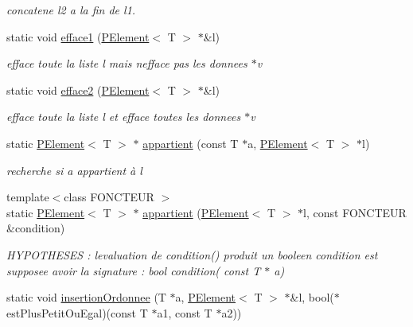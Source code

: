 \begin{DoxyCompactItemize}
\begin{DoxyCompactList}\small\item\em concatene l2 a la fin de l1. \end{DoxyCompactList}\item 
static void \mbox{\hyperlink{class_p_element_abd2e6b05692413616650fcd953317324}{efface1}} (\mbox{\hyperlink{class_p_element}{P\+Element}}$<$ T $>$ $\ast$\&l)
\begin{DoxyCompactList}\small\item\em efface toute la liste l mais n\textquotesingle{}efface pas les donnees $\ast$v \end{DoxyCompactList}\item 
static void \mbox{\hyperlink{class_p_element_a9e377727c7c78db9f49a7dde2ead74cd}{efface2}} (\mbox{\hyperlink{class_p_element}{P\+Element}}$<$ T $>$ $\ast$\&l)
\begin{DoxyCompactList}\small\item\em efface toute la liste l et efface toutes les donnees $\ast$v \end{DoxyCompactList}\item 
static \mbox{\hyperlink{class_p_element}{P\+Element}}$<$ T $>$ $\ast$ \mbox{\hyperlink{class_p_element_aee7ccc9dcc49558af92960dd60fafc9d}{appartient}} (const T $\ast$a, \mbox{\hyperlink{class_p_element}{P\+Element}}$<$ T $>$ $\ast$l)
\begin{DoxyCompactList}\small\item\em recherche si a appartient à l \end{DoxyCompactList}\item 
{\footnotesize template$<$class F\+O\+N\+C\+T\+E\+UR $>$ }\\static \mbox{\hyperlink{class_p_element}{P\+Element}}$<$ T $>$ $\ast$ \mbox{\hyperlink{class_p_element_ad1ad40db30605db39a57c08058cf444c}{appartient}} (\mbox{\hyperlink{class_p_element}{P\+Element}}$<$ T $>$ $\ast$l, const F\+O\+N\+C\+T\+E\+UR \&condition)
\begin{DoxyCompactList}\small\item\em H\+Y\+P\+O\+T\+H\+E\+S\+ES \+: l\textquotesingle{}evaluation de condition() produit un booleen condition est supposee avoir la signature \+: bool condition( const T $\ast$ a) \end{DoxyCompactList}\item 
static void \mbox{\hyperlink{class_p_element_a0e32256cbecaea72487f347763b38d57}{insertion\+Ordonnee}} (T $\ast$a, \mbox{\hyperlink{class_p_element}{P\+Element}}$<$ T $>$ $\ast$\&l, bool($\ast$est\+Plus\+Petit\+Ou\+Egal)(const T $\ast$a1, const T $\ast$a2))

\end{DoxyCompactItemize}
